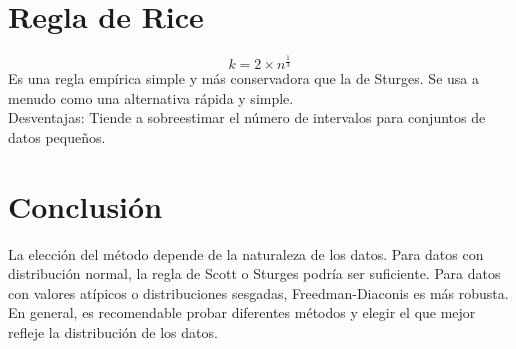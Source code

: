 \documentclass{article}
\begin{document}
\section{Regla de Rice}
\begin{equation}
k = 2 \times n^{\frac{1}{3}}
\end{equation}
Es una regla empírica simple y más conservadora que la de Sturges. Se usa a menudo como una alternativa rápida y simple. \\
Desventajas: Tiende a sobreestimar el número de intervalos para conjuntos de datos pequeños.

\section{Conclusión}
La elección del método depende de la naturaleza de los datos. Para datos con distribución normal, la regla de Scott o Sturges podría ser suficiente. Para datos con valores atípicos o distribuciones sesgadas, Freedman-Diaconis es más robusta. En general, es recomendable probar diferentes métodos y elegir el que mejor refleje la distribución de los datos.
\end{document}
